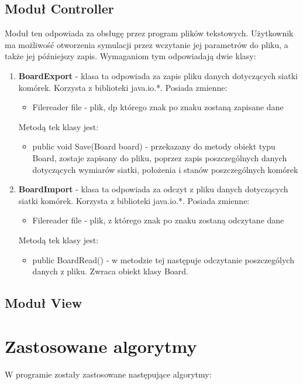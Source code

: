\documentclass[10pt, oneside]{article}
\begin{document}
\subsection {Moduł Controller}
Moduł ten odpowiada za obsługę przez program plików tekstowych. Użytkownik ma możliwość otworzenia symulacji przez wczytanie jej parametrów do pliku, a także jej późniejszy zapis. Wymaganiom tym odpowiadają dwie klasy:
\begin {enumerate}
\item \textbf{BoardExport} - klasa ta odpowiada za zapis pliku danych dotyczących siatki komórek. Korzysta z biblioteki java.io.*.  Posiada zmienne:
\begin{itemize}
\item Filereader file - plik, dp którego znak po znaku zostaną zapisane dane
\end{itemize}
Metodą tek klasy jest:
\begin{itemize}
\item public void Save(Board board) - przekazany do metody obiekt typu Board, zostaje zapisany do pliku, poprzez zapis poszczególnych danych dotyczących wymiarów siatki, położenia i stanów poszczególnych komórek
\end{itemize}


\item \textbf{BoardImport} - klasa ta odpowiada za odczyt z pliku danych dotyczących siatki komórek. Korzysta z biblioteki java.io.*.  Posiada zmienne:
\begin{itemize}
\item Filereader file - plik, z którego znak po znaku zostaną odczytane dane
\end{itemize}
Metodą tek klasy jest:
\begin{itemize}
\item public BoardRead() - w metodzie tej następuje odczytanie poszczególych danych z pliku. Zwraca obiekt klasy Board.
\end{itemize}
\end{enumerate}

\subsection {Moduł View}

\section {Zastosowane algorytmy}
W programie zostały zastosowane następujące algorytmy:
\end{document}
